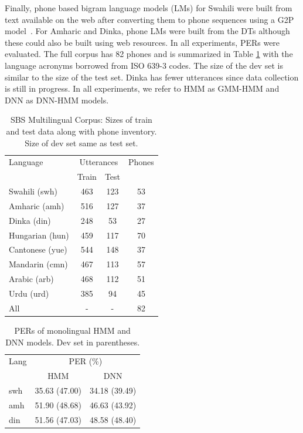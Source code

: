 \documentclass[a4paper]{article}
\begin{document}
Finally, phone based bigram language models (LMs) for Swahili were built from text available on the web after converting them to phone sequences using a G2P model~\cite{MarkG2P}. For Amharic and Dinka, phone LMs were built from the DTs although these could also be built using web resources. In all experiments, PERs were evaluated. The full corpus has 82 phones and is summarized in Table \ref{Tab:SBS Corpus} with the language acronyms borrowed from ISO 639-3 codes. The size of the dev set is similar to the size of the test set. Dinka has fewer utterances since data collection is still in progress. In all experiments, we refer to HMM as GMM-HMM and DNN as DNN-HMM models.
%
\begin{table}[t]
\begin{center}
\caption{SBS Multilingual Corpus: Sizes of train and test data along with phone inventory. Size of dev set same as test set.}
\label{Tab:SBS Corpus}
\begin{tabular}{l|c c| c}
   \hline
Language &  \multicolumn{2}{c|}{Utterances}  & Phones \\
                 &  Train & Test &  \\ \hline
Swahili (swh)     & 463 & 123 & 53 \\
Amharic (amh)     & 516 & 127 & 37 \\
Dinka   (din)     & 248 &  53 & 27 \\
Hungarian (hun)    & 459 & 117 & 70 \\
Cantonese (yue)  & 544 & 148 &  37 \\
Mandarin (cmn) & 467 & 113 &  57 \\
Arabic (arb) & 468 & 112 &  51 \\
Urdu (urd) & 385 & 94 &  45 \\ \hline
All & - & - & 82 \\ \hline
\end{tabular}
\vspace{-5mm}
\end{center}
\end{table}


\begin{table}
\centering %
\caption{PERs of monolingual HMM and DNN models. Dev set in parentheses.}
\begin{tabular}{l|c c}
   \hline
Lang  & \multicolumn{2}{c}{PER (\%)} \\
          & HMM     & DNN   \\ \hline
swh        & 35.63 (47.00)   & 34.18 (39.49)   \\
amh        & 51.90 (48.68)   & 46.63 (43.92)   \\
din        & 51.56 (47.03)   & 48.58 (48.40)  \\ \hline
\end{tabular}
\vspace{-2mm}
\label{Tab:PER_Matched_Monolingual}
\end{table}
\end{document}
